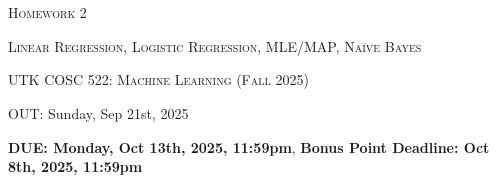 \documentclass[12pt]{article}
\begin{document}
\section*{}
\begin{center}
  \centerline{\textsc{\LARGE  Homework 2}}
  \vspace{0.5em}
  \centerline{\textsc{\large Linear Regression, Logistic Regression, MLE/MAP, Na\"ive Bayes}
  }
  \vspace{1em}
  \textsc{\large UTK COSC 522: Machine Learning (Fall 2025)} \\
  \vspace{0.5em}

  \centerline{OUT: Sunday, Sep 21st, 2025}
  \vspace{0.5em}
  \centerline{\textbf{DUE: Monday, Oct 13th, 2025, 11:59pm}, \textbf{Bonus Point Deadline: Oct 8th, 2025, 11:59pm}}
\end{center}
\end{document}
